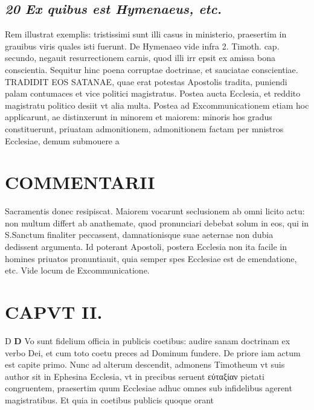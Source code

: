 \documentclass{article}
\begin{document}
\begin{pages}
\subsection*{\textit{20 Ex quibus est Hymenaeus, etc. }}\pstart Rem illustrat exemplis: tristissimi sunt illi casus in ministerio, praesertim in grauibus viris quales isti fuerunt. De Hymenaeo vide infra 2. Timoth. cap. secundo, negauit resurrectionem carnis, quod illi irr epsit ex amissa bona conscientia. Sequitur hinc poena corruptae doctrinae, et sauciatae conscientiae. TRADIDIT EOS SATANAE, quae erat potestas Apostolis tradita, puniendi palam contumaces et vice politici magistratus. Postea aucta Ecclesia, et reddito magistratu politico desiit vt alia multa. Postea ad Excommunicationem etiam hoc applicarunt, ae distinxerunt in minorem et maiorem: minoris hos gradus constituerunt, priuatam admonitionem, admonitionem factam per mnistros Ecclesiae, demum submouere a  \pend
\section*{COMMENTARII }
\marginpar{[ p.42 ]}\pstart Sacramentis donec resipiscat.  \pend\pstart Maiorem vocarunt seclusionem ab omni licito actu: non multum differt ab anathemate, quod pronunciari debebat solum in eos, qui in S.Sanctum finaliter peccassent, damnationisque suae aeternae non dubia dedissent argumenta. Id poterant Apostoli, postera Ecclesia non ita facile in homines priuatos pronuntiauit, quia semper spes Ecclesiae est de emendatione, etc. Vide locum de Excommunicatione.  \pend
\endnumbering\beginnumbering\section{CAPVT II.}D \pstart \textbf{D} Vo sunt fidelium officia in publicis coetibus: audire sanam doctrinam ex verbo Dei, et cum toto coetu preces ad Dominum fundere. De priore iam actum est capite primo. Nunc ad alterum descendit, admonens Timotheum vt suis author sit in Ephesina Ecclesia, vt in precibus seruent εὐταξίαν pietati congruentem, praesertim quum Ecclesiae adhuc omnes sub infidelibus agerent magistratibus.  \pend\pstart Et quia in coetibus publicis quoque orant  \pend

\end{pages}
\end{document}
